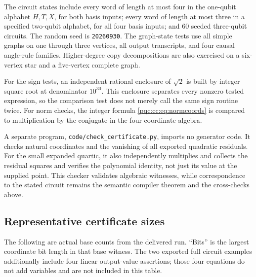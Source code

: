 \documentclass[11pt,letterpaper]{article}
\numberwithin{equation}{section}
\theoremstyle{definition}
\theoremstyle{remark}
\begin{document}
The circuit states include every word of length at most four in the one-qubit
alphabet $H,T,X$, for both basis inputs; every word of length at most three in
a specified two-qubit alphabet, for all four basis inputs; and 60 seeded
three-qubit circuits. The random seed is \texttt{20260930}. The graph-state tests
use all simple graphs on one through three vertices, all output transcripts,
and four causal angle-rule families. Higher-degree copy decompositions are
also exercised on a six-vertex star and a five-vertex complete graph.

For the sign tests, an independent rational enclosure of $\sqrt2$ is built by
integer square root at denominator $10^{30}$. This enclosure separates every
nonzero tested expression, so the comparison test does not merely call the
same sign routine twice. For norm checks, the integer formula
\eqref{pqc:cc:eq:normcoords} is compared to multiplication by the conjugate in the
four-coordinate algebra.

A separate program, \texttt{code/check\_certificate.py}, imports no generator
code. It checks natural coordinates and the vanishing of all exported
quadratic residuals. For the small expanded quartic, it also independently
multiplies and collects the residual squares and verifies the polynomial
identity, not just its value at the supplied point. This checker validates
algebraic witnesses, while correspondence to the stated circuit remains the
semantic compiler theorem and the cross-checks above.

\subsection{Representative certificate sizes}

The following are actual base counts from the delivered run. ``Bits'' is the
largest coordinate bit length in that base witness. The two exported full
circuit examples additionally include four linear output-value assertions;
those four equations do not add variables and are not included in this table.
\end{document}
